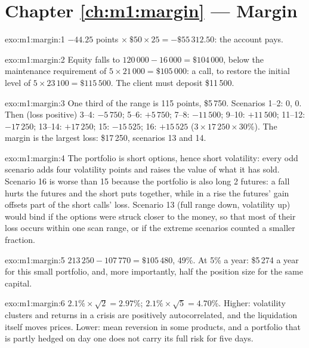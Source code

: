 \section*{Chapter \ref{ch:m1:margin} --- Margin}

\begin{solution}{exo:m1:margin:1}
$-44.25$ points $\times\ \$50 \times 25 = -\$55\,312.50$: the account pays.
\end{solution}

\begin{solution}{exo:m1:margin:2}
Equity falls to $120\,000 - 16\,000 = \$104\,000$, below the maintenance
requirement of $5 \times 21\,000 = \$105\,000$: a call, to restore the initial
level of $5 \times 23\,100 = \$115\,500$. The client must deposit \$11\,500.
\end{solution}

\begin{solution}{exo:m1:margin:3}
One third of the range is 115 points, \$5\,750. Scenarios 1--2: 0, 0. Then
(loss positive) 3--4: $-5\,750$; 5--6: $+5\,750$; 7--8: $-11\,500$; 9--10:
$+11\,500$; 11--12: $-17\,250$; 13--14: $+17\,250$; 15: $-15\,525$; 16:
$+15\,525$ ($3 \times 17\,250 \times 30\%$). The margin is the largest loss:
\$17\,250, scenarios 13 and 14.
\end{solution}

\begin{solution}{exo:m1:margin:4}
The portfolio is short options, hence short volatility: every odd scenario
adds four volatility points and raises the value of what it has sold.
Scenario 16 is worse than 15 because the portfolio is also long 2 futures:
a fall hurts the futures and the short puts together, while in a rise the
futures' gain offsets part of the short calls' loss. Scenario 13 (full range
down, volatility up) would bind if the options were struck closer to the
money, so that most of their loss occurs within one scan range, or if the
extreme scenarios counted a smaller fraction.
\end{solution}

\begin{solution}{exo:m1:margin:5}
$213\,250 - 107\,770 = \$105\,480$, 49\%. At 5\% a year: \$5\,274 a year for this
small portfolio, and, more importantly, half the position size for the same
capital.
\end{solution}

\begin{solution}{exo:m1:margin:6}
$2.1\% \times \sqrt2 = 2.97\%$; $2.1\% \times \sqrt5 = 4.70\%$. Higher: volatility
clusters and returns in a crisis are positively autocorrelated, and the
liquidation itself moves prices. Lower: mean reversion in some products, and
a portfolio that is partly hedged on day one does not carry its full risk for
five days.
\end{solution}

